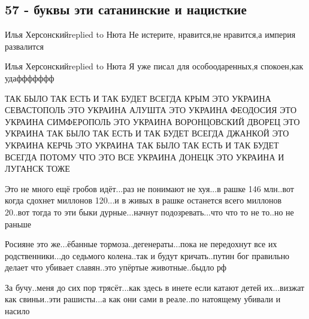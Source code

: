\subsection{57 - буквы эти сатанинские и нацисткие}





Илья Херсонскийreplied to Нюта
Не истерите, нравится,не нравится,а империя развалится

Илья Херсонскийreplied to Нюта
Я уже писал для особоодаренных,я спокоен,как удаффффффф

ТАК БЫЛО ТАК ЕСТЬ И ТАК БУДЕТ ВСЕГДА КРЫМ ЭТО УКРАИНА СЕВАСТОПОЛЬ ЭТО УКРАИНА
АЛУШТА ЭТО УКРАИНА ФЕОДОСИЯ ЭТО УКРАИНА СИМФЕРОПОЛЬ ЭТО УКРАИНА ВОРОНЦОВСКИЙ
ДВОРЕЦ ЭТО УКРАИНА ТАК БЫЛО ТАК ЕСТЬ И ТАК БУДЕТ ВСЕГДА ДЖАНКОЙ ЭТО УКРАИНА
КЕРЧЬ ЭТО УКРАИНА ТАК БЫЛО ТАК ЕСТЬ И ТАК БУДЕТ ВСЕГДА ПОТОМУ ЧТО ЭТО ВСЕ
УКРАИНА ДОНЕЦК ЭТО УКРАИНА И ЛУГАНСК ТОЖЕ

Это не много ещё гробов идёт...раз не понимают не хуя...в рашке 146 млн..вот
когда сдохнет миллонов 120...и в живых в рашке останется всего миллонов 20..вот
тогда то эти быки дурные...начнут подозревать...что что то не то..но не раньше

Росияне это же...ёбанные тормоза..дегенераты...пока не передохнут все их
родственники...до седьмого колена..так и будут кричать..путин бог правильно
делает что убивает славян..это упёртые животные..быдло рф

За бучу..меня до сих пор трясёт...как здесь в инете если катают детей
их...визжат как свиньи..эти рашисты...а как они сами в реале..по натоящему
убивали и насило




